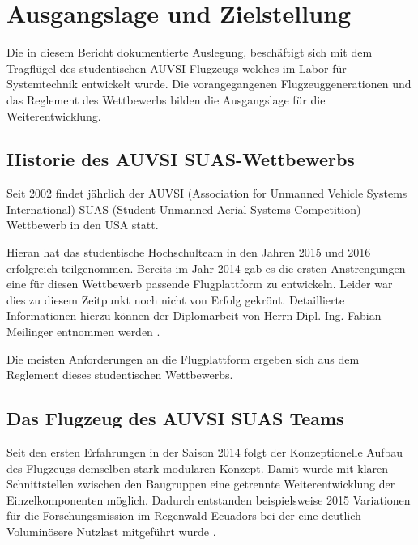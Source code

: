 \chapter{Ausgangslage und Zielstellung}\label{cha:Ausgangslage und Zielstellung}

Die in diesem Bericht dokumentierte Auslegung, beschäftigt sich mit dem Tragflügel des studentischen AUVSI Flugzeugs welches im Labor für Systemtechnik entwickelt wurde. Die vorangegangenen Flugzeuggenerationen und das Reglement des Wettbewerbs bilden die Ausgangslage für die Weiterentwicklung.

\section{Historie des AUVSI SUAS-Wettbewerbs}
Seit 2002 findet jährlich der AUVSI (Association for Unmanned Vehicle Systems International) SUAS (Student Unmanned Aerial Systems Competition)-Wettbewerb in den USA statt.

Hieran hat das studentische Hochschulteam in den Jahren 2015 und 2016 erfolgreich teilgenommen. Bereits im Jahr 2014 gab es die ersten Anstrengungen eine für diesen Wettbewerb passende Flugplattform zu entwickeln. Leider war dies zu diesem Zeitpunkt noch nicht von Erfolg gekrönt. Detaillierte Informationen hierzu können der Diplomarbeit von Herrn Dipl. Ing. Fabian Meilinger entnommen werden \cite{Meiling}.

Die meisten Anforderungen an die Flugplattform ergeben sich aus dem Reglement dieses studentischen Wettbewerbs. 

\clearpage

\section{Das Flugzeug des AUVSI SUAS Teams}

Seit den ersten Erfahrungen in der Saison 2014 folgt der Konzeptionelle Aufbau des Flugzeugs demselben stark modularen Konzept. Damit wurde mit klaren Schnittstellen zwischen den Baugruppen eine getrennte Weiterentwicklung der Einzelkomponenten möglich. Dadurch entstanden beispielsweise 2015 Variationen für die Forschungsmission im Regenwald Ecuadors bei der eine deutlich Voluminösere Nutzlast mitgeführt wurde \cite{Niclas}.

